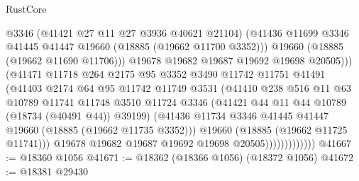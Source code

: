 \begin{lexlean}{RustCore}
\begin{coremodule}
                                  @3346
                                  (@41421 @27 @11 @27 @3936 @40621 @21104)
                                  (@41436
                                    @11699
                                    @3346
                                    @41445
                                    @41447
                                    @19660
                                    (@18885 (@19662 @11700 @3352)))
                                  @19660
                                  (@18885 (@19662 @11690 @11706)))
                                @19678
                                @19682
                                @19687
                                @19692
                                @19698
                                @20505)))
                          (@41471
                            @11718
                            @264
                            @2175
                            @95
                            @3352
                            @3490
                            @11742
                            @11751
                            @41491
                            (@41403
                              @2174
                              @64
                              @95
                              @11742
                              @11749
                              @3531
                              (@41410
                                @238
                                @516
                                @11
                                @63
                                @10789
                                @11741
                                @11748
                                @3510
                                @11724
                                @3346
                                (@41421 @44 @11 @44 @10789 (@18734 (@40491 @44)) @39199)
                                (@41436
                                  @11734
                                  @3346
                                  @41445
                                  @41447
                                  @19660
                                  (@18885 (@19662 @11735 @3352)))
                                @19660
                                (@18885 (@19662 @11725 @11741)))
                              @19678
                              @19682
                              @19687
                              @19692
                              @19698
                              @20505)))))))))))))
@41667 := @18360 @1056
@41671 := @18362 (@18366 @1056) (@18372 @1056)
@41672 := @18381 @29430

\end{coremodule}
\end{lexlean}
